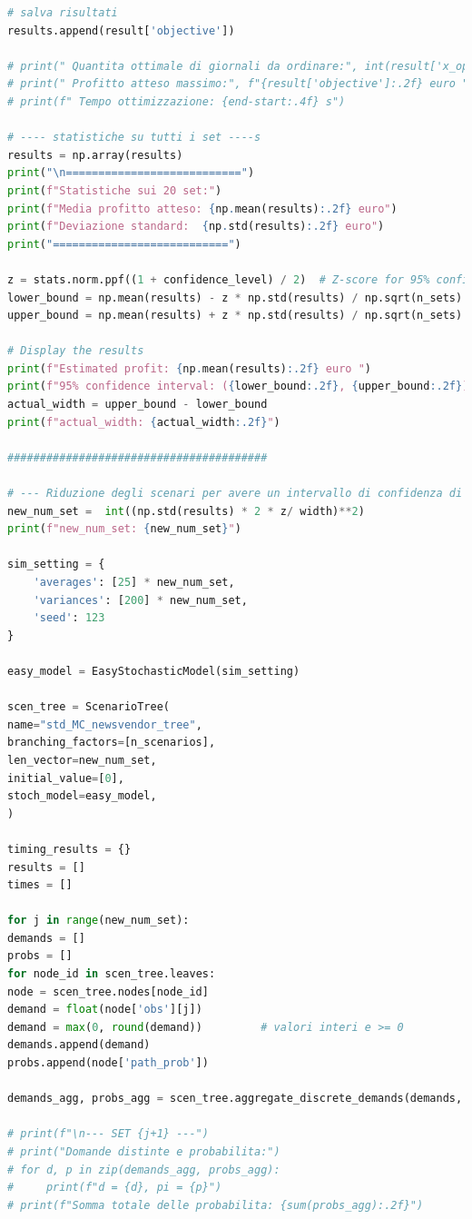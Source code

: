 \documentclass[a4paper,12pt]{article}
\begin{document}
\begin{lstlisting}[language=python,caption={Main of Newvendor problem},label={lst:main-nv}]
# salva risultati
results.append(result['objective'])

# print(" Quantita ottimale di giornali da ordinare:", int(result['x_opt']))
# print(" Profitto atteso massimo:", f"{result['objective']:.2f} euro ")
# print(f" Tempo ottimizzazione: {end-start:.4f} s")

# ---- statistiche su tutti i set ----s
results = np.array(results)
print("\n===========================")
print(f"Statistiche sui 20 set:")
print(f"Media profitto atteso: {np.mean(results):.2f} euro")
print(f"Deviazione standard:  {np.std(results):.2f} euro")
print("===========================")

z = stats.norm.ppf((1 + confidence_level) / 2)  # Z-score for 95% confidence interval
lower_bound = np.mean(results) - z * np.std(results) / np.sqrt(n_sets)
upper_bound = np.mean(results) + z * np.std(results) / np.sqrt(n_sets)

# Display the results
print(f"Estimated profit: {np.mean(results):.2f} euro ")
print(f"95% confidence interval: ({lower_bound:.2f}, {upper_bound:.2f})")
actual_width = upper_bound - lower_bound
print(f"actual_width: {actual_width:.2f}")

########################################

# --- Riduzione degli scenari per avere un intervallo di confidenza di 10 euro ---
new_num_set =  int((np.std(results) * 2 * z/ width)**2)
print(f"new_num_set: {new_num_set}")

sim_setting = {
	'averages': [25] * new_num_set,
	'variances': [200] * new_num_set,
	'seed': 123
}

easy_model = EasyStochasticModel(sim_setting)

scen_tree = ScenarioTree(
name="std_MC_newsvendor_tree",
branching_factors=[n_scenarios], 
len_vector=new_num_set,
initial_value=[0],
stoch_model=easy_model,
)

timing_results = {}
results = []
times = []

for j in range(new_num_set):
demands = []
probs = []
for node_id in scen_tree.leaves:
node = scen_tree.nodes[node_id]
demand = float(node['obs'][j])         
demand = max(0, round(demand))         # valori interi e >= 0
demands.append(demand)
probs.append(node['path_prob'])

demands_agg, probs_agg = scen_tree.aggregate_discrete_demands(demands, probs)

# print(f"\n--- SET {j+1} ---")
# print("Domande distinte e probabilita:")
# for d, p in zip(demands_agg, probs_agg):
#     print(f"d = {d}, pi = {p}")
# print(f"Somma totale delle probabilita: {sum(probs_agg):.2f}")


\end{lstlisting}
\end{document}
